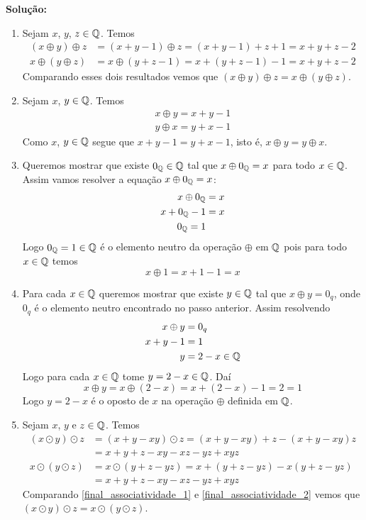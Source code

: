 \documentclass[12pt]{article}
\begin{document}
\noindent\textbf{Solu\c{c}\~ao:}
\begin{enumerate}
	\item Sejam $x$, $y$, $z \in \mathbb{Q}$. Temos
	\begin{align*}
		(x \oplus y) \oplus z &= (x + y - 1) \oplus z = (x + y - 1) + z + 1 = x + y + z - 2\\
		x \oplus (y \oplus z) &= x \oplus (y + z - 1) = x + (y + z - 1) - 1 = x + y + z - 2
	\end{align*}
	Comparando esses dois resultados vemos que $(x \oplus y) \oplus z = x \oplus (y \oplus z)$.

	\item Sejam $x$, $y \in \mathbb{Q}$. Temos
	\begin{align*}
		x \oplus y = x + y - 1\\
		y \oplus x = y + x - 1
	\end{align*}
	Como $x$, $y \in \mathbb{Q}$ segue que $x + y - 1 = y + x - 1$, isto é, $x \oplus y = y \oplus x$.

	\item Queremos mostrar que existe $0_{\mathbb{Q}} \in \mathbb{Q}$ tal que $x \oplus 0_{\mathbb{Q}} = x$ para todo $x \in \mathbb{Q}$.
	Assim vamos resolver a equação $x \oplus 0_{\mathbb{Q}} = x$:
	\begin{align*}
		x\oplus 0_{\mathbb{Q}} &= x\\
		x + 0_{\mathbb{Q}} - 1 &= x\\
		0_{\mathbb{Q}} = 1
	\end{align*}
	Logo $0_{\mathbb{Q}} = 1 \in \mathbb{Q}$ é o elemento neutro da operação $\oplus$ em $\mathbb{Q}$ pois para todo $x \in \mathbb{Q}$ temos
	\[
		x \oplus 1 = x + 1 - 1 = x
	\]

	\item Para cada $x \in \mathbb{Q}$ queremos mostrar que existe $y \in \mathbb{Q}$ tal que $x \oplus y = 0_q$, onde $0_q$ é o elemento neutro encontrado no passo anterior. Assim resolvendo
	\begin{align*}
		x \oplus y &= 0_q\\
		x + y - 1 &= 1\\
		y &= 2 - x \in \mathbb{Q}
	\end{align*}
	Logo para cada $x \in \mathbb{Q}$ tome $y = 2 - x \in \mathbb{Q}$. Daí
	\[
		x \oplus y = x \oplus (2 - x) = x + (2 - x) - 1 = 2 = 1
	\]
	Logo $y = 2 - x$ é o oposto de $x$ na operação $\oplus$ definida em $\mathbb{Q}$.

	\item Sejam $x$, $y$ e $z \in \mathbb{Q}$. Temos
	\begin{align}
		(x \odot y) \odot z &= (x + y - xy) \odot z = (x + y - xy) + z - (x + y - xy)z \nonumber\\ &= x + y + z - xy - xz - yz + xyz\label{final_associatividade_1}\\
		x \odot (y \odot z) &= x \odot (y + z - yz) = x + (y + z - yz) - x(y + z - yz)\nonumber\\ &= x + y + z - xy - xz - yz + xyz\label{final_associatividade_2}
	\end{align}
	Comparando \eqref{final_associatividade_1} e \eqref{final_associatividade_2} vemos que $(x \odot y) \odot z = x \odot (y \odot z)$.


\end{enumerate}
\end{document}
